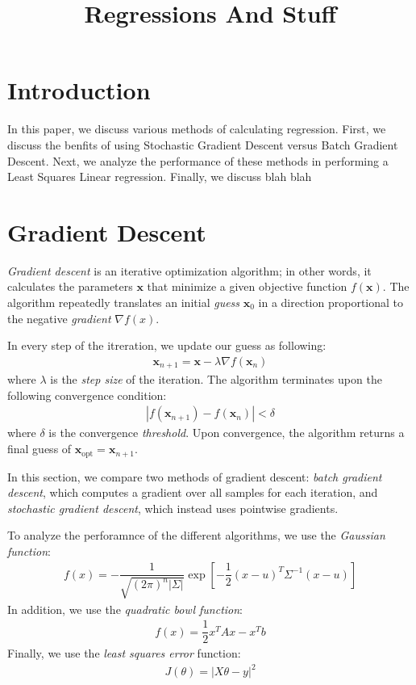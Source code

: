 \documentclass[10pt]{paper}
\title{Regressions And Stuff}
\begin{document}
\maketitle
\section{Introduction}

In this paper, we discuss various methods of calculating regression. First, we discuss the benfits of using Stochastic Gradient Descent versus Batch Gradient Descent. Next, we analyze the performance of these methods in performing a Least Squares Linear regression. Finally, we discuss blah blah

\section{Gradient Descent}

\emph{Gradient descent} is an iterative optimization algorithm; in other words, it calculates the parameters $\mathbf{x}$ that minimize a given objective function $f(\mathbf{x})$. The algorithm repeatedly translates an initial \emph{guess} $\mathbf{x}_0$ in a direction proportional to the negative \emph{gradient} $\nabla f(x)$.

In every step of the itreration, we update our guess as following:
\begin{align*}
\mathbf{x}_{n+1} = \mathbf{x} - \lambda \nabla f(\mathbf{x}_{n})
\end{align*}
where $\lambda$ is the \emph{step size} of the iteration. The algorithm terminates upon the following convergence condition: 
\begin{align*}
|f(\mathbf{x}_{n+1}) - f(\mathbf{x}_{n})| < \delta
\end{align*}
where $\delta$ is the convergence \emph{threshold}. Upon convergence, the algorithm returns a final guess of $\mathbf{x}_{\text{opt}} = \mathbf{x}_{n+1}$.

In this section, we compare two methods of gradient descent: \emph{batch gradient descent}, which computes a gradient over all samples for each iteration, and \emph{stochastic gradient descent}, which instead uses pointwise gradients.

To analyze the perforamnce of the different algorithms, we use the \emph{Gaussian function}:
\begin{align*}
f(x) = - \dfrac{1}{\sqrt{(2\pi)^n |\Sigma|}} \exp \left[-\dfrac{1}{2} (x - u)^T \Sigma^{-1} (x-u)\right]
\end{align*}
In addition, we use the \emph{quadratic bowl function}:
\begin{align*}
f(x) = \dfrac{1}{2} x^T A x - x^T b 
\end{align*}
Finally, we use the \emph{least squares error} function:
\begin{align*}
J(\theta) = |X\theta - y|^2
\end{align*}
\end{document}
